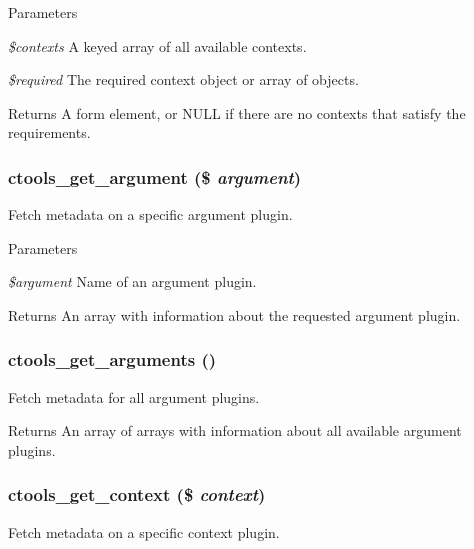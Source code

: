 \begin{DoxyParams}{Parameters}
\item[{\em \$contexts}]A keyed array of all available contexts. \item[{\em \$required}]The required context object or array of objects.\end{DoxyParams}
\begin{DoxyReturn}{Returns}
A form element, or NULL if there are no contexts that satisfy the requirements. 
\end{DoxyReturn}
\hypertarget{context_8inc_a008e36a5cbc918184c3227c92543cbac}{
\subsubsection[{ctools\_\-get\_\-argument}]{\setlength{\rightskip}{0pt plus 5cm}ctools\_\-get\_\-argument (\$ {\em argument})}}
\label{context_8inc_a008e36a5cbc918184c3227c92543cbac}
Fetch metadata on a specific argument plugin.


\begin{DoxyParams}{Parameters}
\item[{\em \$argument}]Name of an argument plugin.\end{DoxyParams}
\begin{DoxyReturn}{Returns}
An array with information about the requested argument plugin. 
\end{DoxyReturn}
\hypertarget{context_8inc_afbc5e7faf33cdfa3148b17bf51934867}{
\subsubsection[{ctools\_\-get\_\-arguments}]{\setlength{\rightskip}{0pt plus 5cm}ctools\_\-get\_\-arguments ()}}
\label{context_8inc_afbc5e7faf33cdfa3148b17bf51934867}
Fetch metadata for all argument plugins.

\begin{DoxyReturn}{Returns}
An array of arrays with information about all available argument plugins. 
\end{DoxyReturn}
\hypertarget{context_8inc_a921be4a2425a4ccdbd236f4f7c18fd41}{
\subsubsection[{ctools\_\-get\_\-context}]{\setlength{\rightskip}{0pt plus 5cm}ctools\_\-get\_\-context (\$ {\em context})}}
\label{context_8inc_a921be4a2425a4ccdbd236f4f7c18fd41}
Fetch metadata on a specific context plugin.


